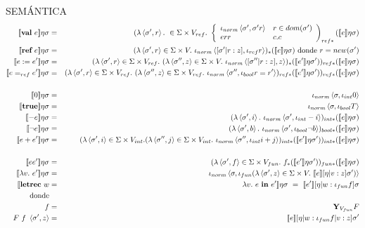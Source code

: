     \PN SEMÁNTICA
    \begin{eqnarray*}
      \se{\textbf{val}\ e}\eta\s &=& (\lambda \la\s',r\ra.\ \in \Sigma \times V_{ref}.
        \ \left\lbrace 
        \begin{array}{lll}
          \iota_{norm} \la\s',\s' r\ra & r\in dom(\s') \\
          err & c.c
        \end{array}\right)_{ref*} (\se{e}\eta\s) \\
      \se{\textbf{ref} \ e}\eta\s &=& (\lambda \la\s',r\ra \in \Sigma \times V.\ \iota_{norm}\la[\s'|r:z],\iota_{ref}r\ra)_* (\se{e}\eta\s) \text{ donde } r = new(\sigma')\\
      \se{e:=e'}\eta\s &=& (\lambda \la\s',r\ra \in \Sigma \times V_{ref}.\ (\lambda \la\s'',z\ra \in \Sigma \times V.\ \iota_{norm} \la[\s''|r:z],z\ra)_* (\se{e'}\eta\s') )_{ref*} (\se{e}\eta\s) \\
      \se{e=_{ref}e'}\eta\s &=& (\lambda \la\s',r\ra \in \Sigma \times V_{ref}.\ (\lambda \la\s'',z\ra \in \Sigma \times V_{ref}.\ \iota_{norm} \la\s'',\iota_{bool}r=r'\ra)_{ref*} (\se{e'}\eta\s') )_{ref*}(\se{e}\eta\s) \\ \\
      \se{0}\eta\s &=& \iota_{norm}\la \s,\iota_{int}0\ra \\
      \se{\textbf{true}}\eta\s &=& \iota_{norm}\la \s,\iota_{bool}T\ra \\
      \se{-e}\eta\s &=& (\lambda \la \s',i\ra.\ \iota_{norm}\la \s',\iota_{int}-i\ra)_{int*}(\se{e}\eta\s) \\
      \se{\neg e}\eta\s &=& (\lambda \la \s',b\ra.\ \iota_{norm}\la \s',\iota_{bool}\neg b\ra)_{bool*}(\se{e}\eta\s) \\
      \se{e+e'}\eta\s &=& (\lambda \la \s',i\ra \in \Sigma \times V_{int}.(\lambda \la \s'',j\ra \in \Sigma \times V_{int}.\  \iota_{norm}\la \s'',\iota_{int}i+j\ra)_{int*}(\se{e'}\eta\s'))_{int*}(\se{e}\eta\s) \\ \\
      \se{ee'}\eta\s &=& (\lambda \la \s',f\ra \in \Sigma \times V_{fun}.\ f_* (\se{e'}\eta\s'))_{fun*}(\se{e}\eta\s) \\
      \se{\lambda v.\  e'}\eta\s &=&  \iota_{norm}\la \s, \iota_{fun}(\lambda \la\s',z\ra \in \Sigma \times V.\ \se{e}[\eta|v:z]\s')\ra \\
      \se{\textbf{letrec}\ w &=& \lambda v.\  e\ine e'}\eta\s \ = \ \se{e'}[\eta|w:\iota_{fun}f]\s \\
      \text{donde} && \\
      f &=& \textbf{Y}_{V_{fun}}F \\
      F\ f \ \la\s',z\ra &=& \se{e}[\eta|w:\iota_{fun} f|v:z]\s'
    \end{eqnarray*}

